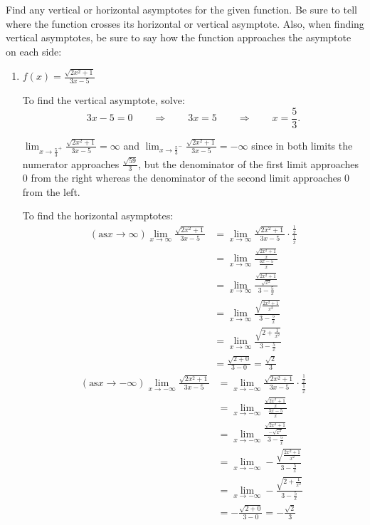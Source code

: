\documentclass[nooutcomes]{ximera}
\begin{document}
	
\begin{problem}

Find any vertical or horizontal asymptotes for the given function.  Be sure to tell where the function crosses its horizontal or vertical asymptote.  Also, when finding vertical asymptotes, be sure to say how the function approaches the asymptote on each side:

	\begin{enumerate}
	
	\item  $f(x) = \frac{\sqrt{2x^2 + 1}}{3x-5}$
		
		\begin{freeResponse}
		To find the vertical asymptote, solve:
		$$3x-5=0 \qquad \Longrightarrow \qquad 3x = 5 \qquad \Longrightarrow \qquad x = \frac{5}{3}.$$
		
		$\lim_{x \to \frac{5}{3}^+} \frac{\sqrt{2x^2 + 1}}{3x-5} = \infty$ and $\lim_{x \to \frac{5}{3}^-} \frac{\sqrt{2x^2 + 1}}{3x-5} = - \infty$ since in both limits the numerator approaches $\frac{\sqrt{59}}{3}$, but the denominator of the first limit approaches $0$ from the right whereas the denominator of the second limit approaches $0$ from the left.
		
		To find the horizontal asymptotes:
		\begin{align*}
		(\text{as} x \to \infty)  \lim_{x \to \infty} \frac{\sqrt{2x^2 + 1}}{3x-5} &= \lim_{x \to \infty} \frac{\sqrt{2x^2 + 1}}{3x-5} \cdot \frac{\frac{1}{x}}{\frac{1}{x}} \\
		&= \lim_{x \to \infty} \frac{\frac{\sqrt{2x^2 + 1}}{x}}{\frac{3x-5}{x}} \\
		&= \lim_{x \to \infty}  \frac{\frac{\sqrt{2x^2 + 1}}{\sqrt{x^2}}}{3 - \frac{5}{x}} \\
		&= \lim_{x \to \infty}  \frac{\sqrt{\frac{2x^2 + 1}{x^2}}}{3 - \frac{5}{x}} \\
		&= \lim_{x \to \infty}  \frac{\sqrt{2 + \frac{1}{x^2}}}{3 - \frac{5}{x}} \\
		&= \frac{\sqrt{2+0}}{3-0} = \frac{\sqrt{2}}{3} 
		\end{align*}
		\begin{align*}
		(\text{as} x \to -\infty)  \lim_{x \to -\infty} \frac{\sqrt{2x^2 + 1}}{3x-5} &= \lim_{x \to -\infty} \frac{\sqrt{2x^2 + 1}}{3x-5} \cdot \frac{\frac{1}{x}}{\frac{1}{x}} \\
		&= \lim_{x \to -\infty} \frac{\frac{\sqrt{2x^2 + 1}}{x}}{\frac{3x-5}{x}} \\
		&= \lim_{x \to -\infty}  \frac{\frac{\sqrt{2x^2 + 1}}{-\sqrt{x^2}}}{3 - \frac{5}{x}} \\
		&= \lim_{x \to -\infty}  -\frac{\sqrt{\frac{2x^2 + 1}{x^2}}}{3 - \frac{5}{x}} \\
		&= \lim_{x \to -\infty}  -\frac{\sqrt{2 + \frac{1}{x^2}}}{3 - \frac{5}{x}} \\
		&= -\frac{\sqrt{2+0}}{3-0} = -\frac{\sqrt{2}}{3} 
		\end{align*}
		

\end{freeResponse}
\end{enumerate}
\end{problem}
\end{document}
